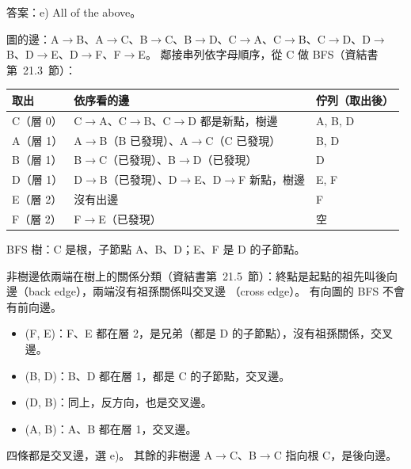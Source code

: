 \begin{pastsoln}
答案：e) All of the above。

圖的邊：A$\to$B、A$\to$C、B$\to$C、B$\to$D、C$\to$A、C$\to$B、C$\to$D、D$\to$B、D$\to$E、D$\to$F、F$\to$E。
鄰接串列依字母順序，從 C 做 BFS（資結書第~21.3~節）：
\begin{center}
\begin{tabular}{lll}
\toprule
取出 & 依序看的邊 & 佇列（取出後） \\
\midrule
C（層 0） & C$\to$A、C$\to$B、C$\to$D 都是新點，樹邊 & A, B, D \\
A（層 1） & A$\to$B（B 已發現）、A$\to$C（C 已發現） & B, D \\
B（層 1） & B$\to$C（已發現）、B$\to$D（已發現） & D \\
D（層 1） & D$\to$B（已發現）、D$\to$E、D$\to$F 新點，樹邊 & E, F \\
E（層 2） & 沒有出邊 & F \\
F（層 2） & F$\to$E（已發現） & 空 \\
\bottomrule
\end{tabular}
\end{center}
BFS 樹：C 是根，子節點 A、B、D；E、F 是 D 的子節點。

非樹邊依兩端在樹上的關係分類（資結書第~21.5~節）：終點是起點的祖先叫後向邊（back edge），兩端沒有祖孫關係叫交叉邊
（cross edge）。 有向圖的 BFS 不會有前向邊。
\begin{itemize}
\item (F, E)：F、E 都在層 2，是兄弟（都是 D 的子節點），沒有祖孫關係，交叉邊。
\item (B, D)：B、D 都在層 1，都是 C 的子節點，交叉邊。
\item (D, B)：同上，反方向，也是交叉邊。
\item (A, B)：A、B 都在層 1，交叉邊。
\end{itemize}
四條都是交叉邊，選 e)。 其餘的非樹邊 A$\to$C、B$\to$C 指向根 C，是後向邊。
\end{pastsoln}
